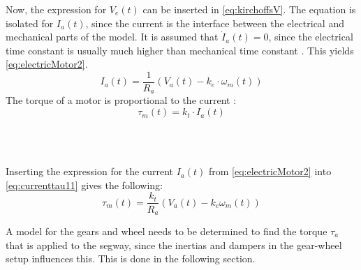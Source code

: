 Now, the expression for $V_e(t)$ can be inserted in \autoref{eq:kirchoffsV}. The equation is isolated for $I_a(t)$, since the current is the interface between the electrical and mechanical parts of the model. It is assumed that $\dot I_a(t) = 0$, since the electrical time constant is usually much higher than mechanical time constant \citep[p. 74]{sou:Feedback}. This yields \autoref{eq:electricMotor2}.
\begin{equation}
\label{eq:electricMotor2}
I_a(t) = \frac{1}{R_a} \left( V_a(t) - k_e \cdot \omega_m(t) \right)
\end{equation}
The torque of a motor is proportional to the current \citep[p. 14]{modelnote}:
\begin{equation}
\tau_m(t) = k_t \cdot I_a(t)
\label{eq:currenttau11}
\end{equation}
\begin{where}
\\
\\
\end{where}

Inserting the expression for the current $I_a(t)$ from \autoref{eq:electricMotor2} into \autoref{eq:currenttau11} gives the following:
\begin{equation}
\label{eq:voltageToTorque}
\tau_m(t) = \frac{k_t}{R_a} \left( V_a(t) - k_e \omega_m(t) \right)
\end{equation}
%
%
%
%

A model for the gears and wheel needs to be determined to find the torque $\tau_a$ that is applied to the segway, since the inertias and dampers in the gear-wheel setup influences this. This is done in the following section.

